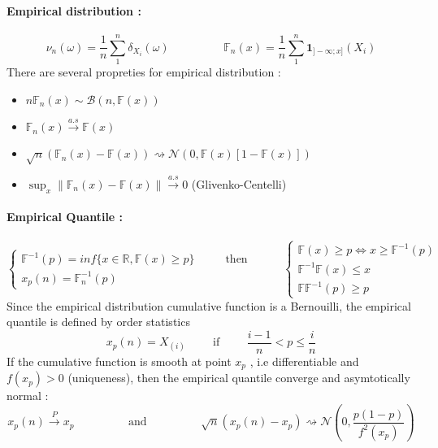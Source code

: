 \documentclass[a4paper,10pt]{article}
\begin{document}
\paragraph{Empirical distribution : }
\[
\nu_n(\omega) = \frac{1}{n}\sum^{n}_{1} \delta_{X_i}(\omega) \hspace{2cm} 
\mathbb{F}_n(x) = \frac{1}{n} \sum^{n}_{1} \mathbf{1}_{]-\infty;x]}(X_i) 
\]
There are several propreties for empirical distribution :
\begin{itemize}
 \item $n\mathbb{F}_n(x) \sim \mathcal{B}(n,\mathbb{F}(x) )$
 \item $\mathbb{F}_n(x) \xrightarrow{a.s}   \mathbb{F}(x)$
 \item $\sqrt{n}(\mathbb{F}_n(x) -  \mathbb{F}(x)) \rightsquigarrow   \mathcal{N}(0,\mathbb{F}(x)[1-\mathbb{F}(x)] )$
 \item $\sup_{x} \| \mathbb{F}_n(x) -  \mathbb{F}(x) \| \xrightarrow{a.s} 0 $  (Glivenko-Centelli)
\end{itemize}
\paragraph{Empirical Quantile : }
\[
\left\{
\begin{array}{l}
\mathbb{F}^{-1}(p) = inf \{ x \in \mathbb{R} , \mathbb{F}(x) \geq p \} \hspace{1cm} \text{ then } \\
x_p(n) = \mathbb{F}_n^{-1}(p)
\end{array}\right.
\hspace{1cm}
\left\{
\begin{array}{l}
 \mathbb{F}(x) \geq p \Longleftrightarrow x \geq \mathbb{F}^{-1}(p) \\
 \mathbb{F}^{-1}\mathbb{F}(x) \leq x   \\
 \mathbb{F}\mathbb{F}^{-1}(p) \geq p   
\end{array}\right. 
\]
Since the empirical distribution cumulative function is a Bernouilli, the empirical quantile is defined by order statistics
\[
x_p(n) = X_{(i)} \hspace{1cm} \text{if} \hspace{1cm} \frac{i-1}{n} < p \leq \frac{i}{n}
\]
If the cumulative function is smooth at point $x_p$ , i.e differentiable and $f(x_p)>0$ (uniqueness), then the empirical quantile converge and asymtotically normal :
\[
x_p(n) \xrightarrow{P} x_p 
\hspace{2cm} \text{and} \hspace{2cm} 
\sqrt{n}(x_p(n) - x_p ) \rightsquigarrow   \mathcal{N}(0,\frac{p(1-p)}{f^2(x_p)} )
\]
\end{document}

